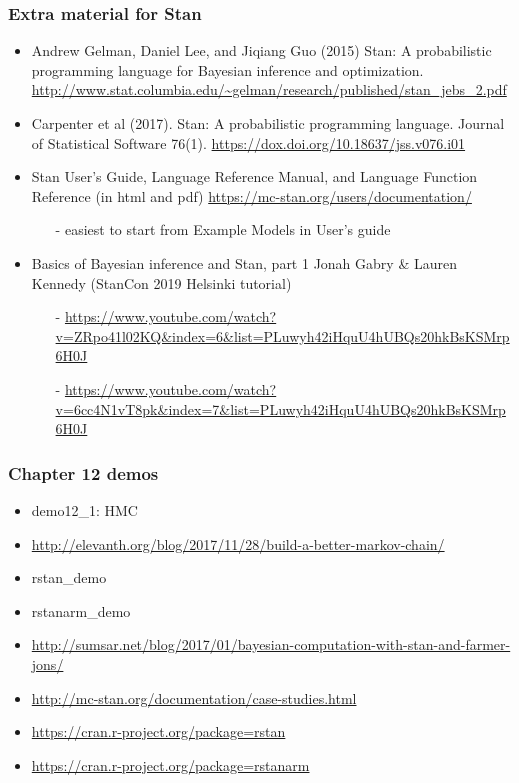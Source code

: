 \documentclass[10pt,handout]{beamer}
\begin{document}
\begin{frame}

\frametitle{Extra material for Stan}

  \begin{itemize}
  \item Andrew Gelman, Daniel Lee, and Jiqiang Guo (2015) Stan: A
    probabilistic programming language for Bayesian inference and
    optimization. \url{http://www.stat.columbia.edu/~gelman/research/published/stan_jebs_2.pdf}
  \item Carpenter et al (2017). Stan: A probabilistic programming
    language. Journal of Statistical Software
    76(1). \url{https://dox.doi.org/10.18637/jss.v076.i01}
  \item Stan User's Guide, Language Reference Manual, and Language
    Function Reference (in html and pdf)
    \url{https://mc-stan.org/users/documentation/}
    \begin{itemize}
    \item[-] easiest to start from Example Models in User's guide
    \end{itemize}
  \item Basics of Bayesian inference and Stan, part 1 Jonah Gabry \&
    Lauren Kennedy (StanCon 2019 Helsinki tutorial)
    \begin{itemize}
    \item[-]
      \url{https://www.youtube.com/watch?v=ZRpo41l02KQ&index=6&list=PLuwyh42iHquU4hUBQs20hkBsKSMrp6H0J}
    \item[-] \url{https://www.youtube.com/watch?v=6cc4N1vT8pk&index=7&list=PLuwyh42iHquU4hUBQs20hkBsKSMrp6H0J}
  \end{itemize}
  \end{itemize}
\end{frame}


\begin{frame}

\frametitle{Chapter 12 demos}

  \begin{itemize}
  \item demo12\_1: HMC
  \item \url{http://elevanth.org/blog/2017/11/28/build-a-better-markov-chain/}
  \item rstan\_demo
  \item rstanarm\_demo
  \item \url{http://sumsar.net/blog/2017/01/bayesian-computation-with-stan-and-farmer-jons/}
  \item \url{http://mc-stan.org/documentation/case-studies.html}
  \item \url{https://cran.r-project.org/package=rstan}
  \item \url{https://cran.r-project.org/package=rstanarm}
  \end{itemize}

\end{frame}
\end{document}
